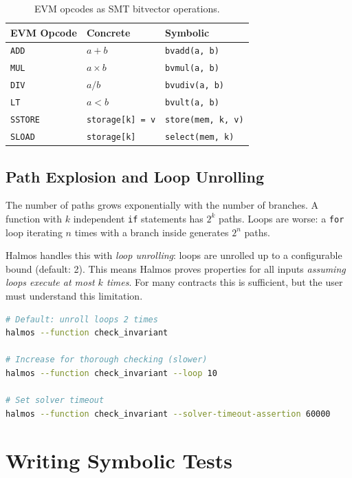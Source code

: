 \documentclass[11pt,a4paper]{article}
\begin{document}
\begin{table}[H]
\centering
\small
\begin{tabular}{@{}lll@{}}
\toprule
\textbf{EVM Opcode} & \textbf{Concrete} & \textbf{Symbolic} \\
\midrule
\texttt{ADD} & $a + b$ & \texttt{bvadd(a, b)} \\
\texttt{MUL} & $a \times b$ & \texttt{bvmul(a, b)} \\
\texttt{DIV} & $a / b$ & \texttt{bvudiv(a, b)} \\
\texttt{LT} & $a < b$ & \texttt{bvult(a, b)} \\
\texttt{SSTORE} & \texttt{storage[k] = v} & \texttt{store(mem, k, v)} \\
\texttt{SLOAD} & \texttt{storage[k]} & \texttt{select(mem, k)} \\
\bottomrule
\end{tabular}
\caption{EVM opcodes as SMT bitvector operations.}
\end{table}

\subsection{Path Explosion and Loop Unrolling}

The number of paths grows exponentially with the number of branches. A function with
$k$ independent \texttt{if} statements has $2^k$ paths. Loops are worse: a \texttt{for}
loop iterating $n$ times with a branch inside generates $2^n$ paths.

Halmos handles this with \emph{loop unrolling}: loops are unrolled up to a configurable
bound (default: 2). This means Halmos proves properties for all inputs \emph{assuming
loops execute at most $k$ times}. For many contracts this is sufficient, but the user
must understand this limitation.

\begin{lstlisting}[language=bash,caption={Running Halmos with loop bounds}]
# Default: unroll loops 2 times
halmos --function check_invariant

# Increase for thorough checking (slower)
halmos --function check_invariant --loop 10

# Set solver timeout
halmos --function check_invariant --solver-timeout-assertion 60000
\end{lstlisting}

\section{Writing Symbolic Tests}
\end{document}
